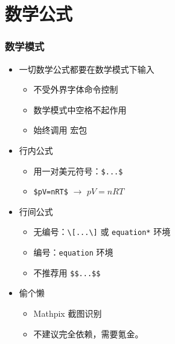 \section{数学公式}
\begin{frame}[fragile]
    \frametitle{数学模式}
    \begin{itemize}
        \item<+-> 一切数学公式都要在数学模式下输入
            \begin{itemize}
                \item 不受外界字体命令控制
                \item 数学模式中空格不起作用
                \item 始终调用  宏包
            \end{itemize}
        \item<+-> 行内公式
            \begin{itemize}
                \item 用一对美元符号：\verb|$...$|
                \item \verb|$pV=nRT$| $\to$ $pV=nRT$
            \end{itemize}
        \item<+-> 行间公式
            \begin{itemize}
                \item 无编号：\verb|\[...\]| 或 \verb|equation*| 环境
                \item 编号：\verb|equation| 环境
                \item \textcolor{tip}{不推荐用 \texttt{\$\$...\$\$}}
            \end{itemize}
        \item<+-> 偷个懒
            \begin{itemize}
                \item Mathpix 截图识别 
                \item 不建议完全依赖，需要氪金。
            \end{itemize}
    \end{itemize}
\end{frame}


